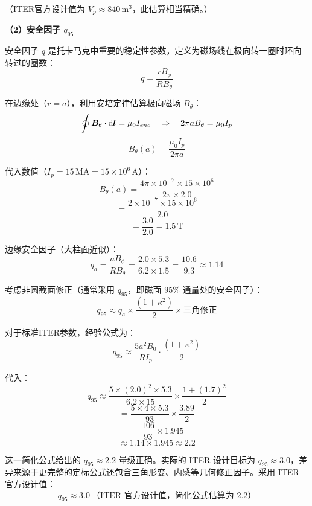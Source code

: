 （ITER官方设计值为 $V_p \approx 840\,\mathrm{m^3}$，此估算相当精确。）

\textbf{（2）安全因子 $q_{95}$}

安全因子 $q$ 是托卡马克中重要的稳定性参数，定义为磁场线在极向转一圈时环向转过的圈数：
\begin{equation}
    q = \frac{r B_{\phi}}{R B_{\theta}}
\label{eq:ch10-safety-factor}
\end{equation}

在边缘处（$r=a$），利用安培定律估算极向磁场 $B_{\theta}$：
\begin{equation}
    \oint \bm{B}_{\theta}\cdot\mathrm{d}\bm{l} = \mu_0 I_{enc} \quad\Rightarrow\quad 2\pi a B_{\theta} = \mu_0 I_p
\label{eq:ch10-ampere-law}
\end{equation}
\begin{equation}
    B_{\theta}(a) = \frac{\mu_0 I_p}{2\pi a}
\label{eq:ch10-poloidal-field}
\end{equation}

代入数值（$I_p=15\,\mathrm{MA}=15\times10^6\,\mathrm{A}$）：
\[
    B_{\theta}(a) = \frac{4\pi\times10^{-7}\times15\times10^6}{2\pi\times2.0}
\]
\[
    = \frac{2\times10^{-7}\times15\times10^6}{2.0}
\]
\[
    = \frac{3.0}{2.0} = 1.5\,\mathrm{T}
\]

边缘安全因子（大柱面近似）：
\[
    q_a = \frac{a B_{\phi}}{R B_{\theta}} = \frac{2.0\times5.3}{6.2\times1.5} = \frac{10.6}{9.3} \approx 1.14
\]

考虑非圆截面修正（通常采用 $q_{95}$，即磁面 $95\%$ 通量处的安全因子）：
\begin{equation}
    q_{95} \approx q_a \times \frac{(1+\kappa^2)}{2} \times \text{三角修正}
\label{eq:ch10-q95-approx}
\end{equation}

对于标准ITER参数，经验公式为：
\begin{equation}
    q_{95} \approx \frac{5 a^2 B_0}{R I_p} \cdot \frac{(1+\kappa^2)}{2}
\label{eq:ch10-q95-empirical}
\end{equation}

代入：
\[
    q_{95} \approx \frac{5\times(2.0)^2\times5.3}{6.2\times15} \times \frac{1+(1.7)^2}{2}
\]
\[
    = \frac{5\times4\times5.3}{93} \times \frac{3.89}{2}
\]
\[
    = \frac{106}{93} \times 1.945
\]
\[
    \approx 1.14 \times 1.945 \approx 2.2
\]

这一简化公式给出的 $q_{95}\approx 2.2$ 量级正确。实际的 ITER 设计目标为 $q_{95}\approx 3.0$，差异来源于更完整的定标公式还包含三角形变、内感等几何修正因子。采用 ITER 官方设计值：
\[
    \boxed{q_{95} \approx 3.0\ \text{（ITER 官方设计值，简化公式估算为 2.2）}}
\]

